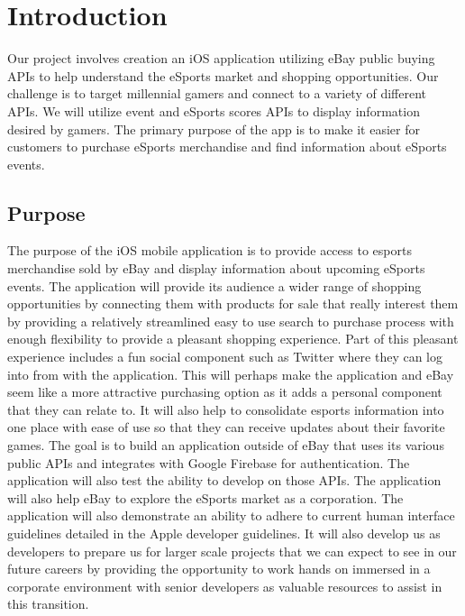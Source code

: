 \documentclass[onecolumn, draftclsnofoot,10pt, compsoc]{IEEEtran}
\begin{document}
\begin{titlepage}
\begin{singlespace}
\begin{abstract}
        \end{abstract}     
    \end{singlespace}
\end{titlepage}
\newpage
{}
\tableofcontents
\clearpage

\section{Introduction}
Our project involves creation an iOS application utilizing eBay public buying APIs to help understand the eSports market and shopping opportunities. 
Our challenge is to target millennial gamers and connect to a variety of different APIs. 
We will utilize event and eSports scores APIs to display information desired by gamers. 
The primary purpose of the app is to make it easier for customers to purchase eSports merchandise and find information about eSports events. 

\subsection{Purpose}
The purpose of the iOS mobile application is to provide access to esports merchandise sold by eBay and display information about upcoming eSports events. The application will provide its audience a wider range of shopping opportunities by connecting them with products for sale that really interest them by providing a relatively streamlined easy to use search to purchase process with enough flexibility to provide a pleasant shopping experience.  Part of this pleasant experience includes a fun social component such as Twitter where they can log into from with the application. This will perhaps make the application and eBay seem like a more attractive purchasing option as it adds a personal component that they can relate to. It will also help to consolidate esports information into one place with ease of use so that they can receive updates about their favorite games. The goal is to build an application outside of eBay that uses its various public APIs and integrates with Google Firebase for authentication. The application will also test the ability to develop on those APIs. The application will also help eBay to explore the eSports market as a corporation. The application will also demonstrate an ability to adhere to current human interface guidelines detailed in the Apple developer guidelines. It will also develop us as developers to prepare us for larger scale projects that we can expect to see in our future careers by providing the opportunity to work hands on immersed in a corporate environment with senior developers as valuable resources to assist in this transition.
\end{document}
